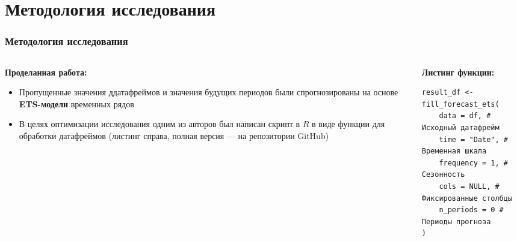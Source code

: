 \section{Методология исследования}

\begin{frame}[fragile]
    \frametitle{Методология исследования}
    \begin{columns}[t]
        \begin{column}{0.5\textwidth}
            \textbf{Проделанная работа:}
            \begin{itemize}
                \item Пропущенные значения ддатафреймов и значения будущих периодов были спрогнозированы на основе \textbf{ETS-модели} временных рядов
                \item В целях оптимизации исследования одним из авторов был написан скрипт в $R$ в виде функции для обработки датафреймов (листинг справа, полная версия — на репозитории GitHub)
            \end{itemize}
        \end{column}

        \begin{column}{0.5\textwidth}
            \textbf{Листинг функции:}
            \begin{verbatim}
result_df <- fill_forecast_ets(
    data = df, # Исходный датафрейм
    time = "Date", # Временная шкала
    frequency = 1, # Сезонность
    cols = NULL, # Фиксированные столбцы
    n_periods = 0 # Периоды прогноза
)
            \end{verbatim}
        \end{column}
    \end{columns}
\end{frame}